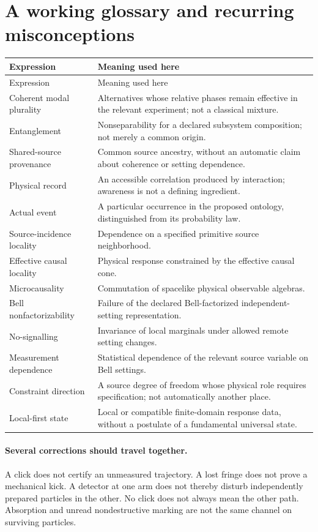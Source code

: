 \documentclass[11pt,a4paper]{article}
\begin{document}
\section{A working glossary and recurring misconceptions}
\label{sec:glossary}
\begin{longtable}{@{}p{}p{}@{}}
\toprule
Expression & Meaning used here\\
\midrule
\endfirsthead
\toprule
Expression & Meaning used here\\
\midrule
\endhead
Coherent modal plurality & Alternatives whose relative phases remain effective in the relevant experiment; not a classical mixture.\\
Entanglement & Nonseparability for a declared subsystem composition; not merely a common origin.\\
Shared-source provenance & Common source ancestry, without an automatic claim about coherence or setting dependence.\\
Physical record & An accessible correlation produced by interaction; awareness is not a defining ingredient.\\
Actual event & A particular occurrence in the proposed ontology, distinguished from its probability law.\\
Source-incidence locality & Dependence on a specified primitive source neighborhood.\\
Effective causal locality & Physical response constrained by the effective causal cone.\\
Microcausality & Commutation of spacelike physical observable algebras.\\
Bell nonfactorizability & Failure of the declared Bell-factorized independent-setting representation.\\
No-signalling & Invariance of local marginals under allowed remote setting changes.\\
Measurement dependence & Statistical dependence of the relevant source variable on Bell settings.\\
Constraint direction & A source degree of freedom whose physical role requires specification; not automatically another place.\\
Local-first state & Local or compatible finite-domain response data, without a postulate of a fundamental universal state.\\
\bottomrule
\end{longtable}

\paragraph{Several corrections should travel together.}
A click does not certify an unmeasured trajectory. A lost fringe does not prove a mechanical kick. A detector at one arm does not thereby disturb independently prepared particles in the other. No click does not always mean the other path. Absorption and unread nondestructive marking are not the same channel on surviving particles.
\end{document}
